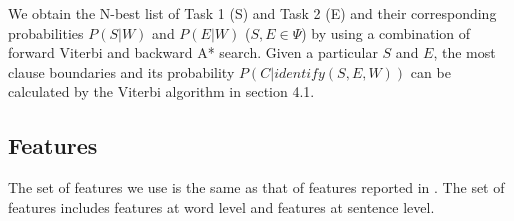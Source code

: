 \documentclass[english]{jnlp_1.4}
\begin{document}
We obtain the N-best list of Task 1 (S) and Task 2 (E) and their
corresponding probabilities $P(S|W)$ and $P(E|W)$ ($S,E \in \Psi$)
by using a combination of forward Viterbi and backward A* search.
Given a particular $S$ and $E$, the most clause boundaries and its
probability $P(C|identify(S,E,W))$ can be calculated by the
Viterbi algorithm in section 4.1.

\subsection{Features}
\label{ssec:features} 

The set of features we use is the same as that
of features reported in \cite{Carreras2005}. The set of features
includes features at word level and features at sentence level.

\end{document}
